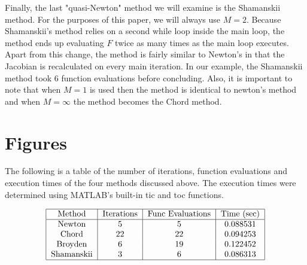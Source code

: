 \documentclass[paper=a4, fontsize=11pt]{scrartcl} %
\numberwithin{equation}{section} %
\numberwithin{figure}{section} %
\numberwithin{table}{section} %
\begin{document}
\bigskip

\indent Finally, the last "quasi-Newton" method we will examine is the Shamanskii method.  For the purposes of this paper, we will always use $M = 2$.  Because Shamanskii's method relies on a second while loop inside the main loop, the method ends up evaluating $F$ twice as many times as the main loop executes.  Apart from this change, the method is fairly similar to Newton's in that the Jacobian is recalculated on every main iteration.  In our example, the Shamanskii method took $6$ function evaluations before concluding.  Also, it is important to note that when $M = 1$ is used then the method is identical to newton's method and when $M = \infty$ the method becomes the Chord method.  

\section{Figures}

The following is a table of the number of iterations, function evaluations and execution times of the four methods discussed above.  The execution times were determined using MATLAB's built-in tic and toc functions.  

$$
\begin{tabular} {| c | c | c | c |}
\hline
Method & Iterations & Func Evaluations & Time (sec) \\
\hline
Newton     & 5  & 5  & 0.088531 \\
Chord      & 22 & 22 & 0.094253 \\
Broyden    & 6  & 19 & 0.122452 \\
Shamanskii & 3  & 6  & 0.086313 \\
\hline
\end{tabular}
$$




\end{document}
